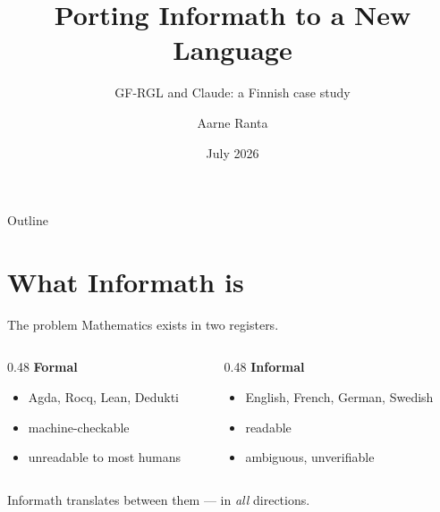 \documentclass[10pt,aspectratio=169]{beamer}
\title{Porting Informath to a New Language}
\subtitle{GF-RGL and Claude: a Finnish case study}
\author{Aarne Ranta}
\date{July 2026}
\begin{document}
\maketitle

\begin{frame}{Outline}
  \tableofcontents
\end{frame}

\section{What Informath is}

\begin{frame}{The problem}
  Mathematics exists in two registers.

  \begin{columns}[T]
    \begin{column}{0.48\textwidth}
      \textbf{Formal}
      \begin{itemize}
        \item Agda, Rocq, Lean, Dedukti
        \item machine-checkable
        \item unreadable to most humans
      \end{itemize}
    \end{column}
    \begin{column}{0.48\textwidth}
      \textbf{Informal}
      \begin{itemize}
        \item English, French, German, Swedish
        \item readable
        \item ambiguous, unverifiable
      \end{itemize}
    \end{column}
  \end{columns}

  \vspace{1em}
  Informath translates between them --- in \emph{all} directions.
\end{frame}
\end{document}
